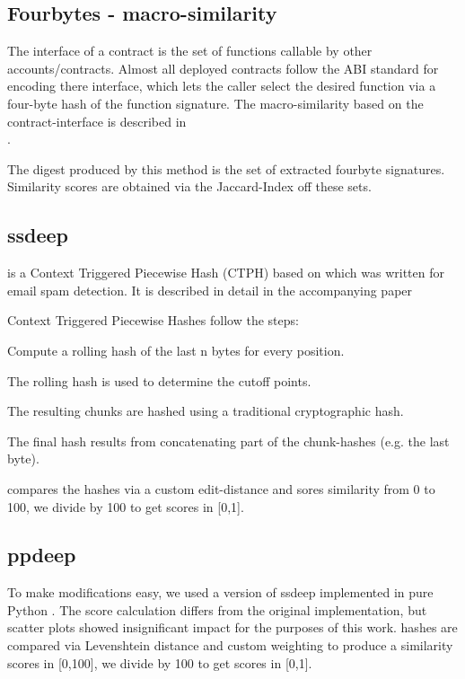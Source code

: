 \documentclass[../main.tex]{subfiles}
\begin{document}
\subsection{Fourbytes - macro-similarity \label{sec:fourbyte}}

The interface of a contract is the set of functions callable by other accounts/contracts.
Almost all deployed contracts follow the ABI standard for encoding there interface, which lets the caller select the desired function via a four-byte hash of the function signature.
The macro-similarity based on the contract-interface is described in \\.

The digest produced by this method is the set of extracted fourbyte signatures. Similarity scores are obtained via the Jaccard-Index  off these sets.

\subsection{ssdeep \label{sec:ssdeep}}
 is a Context Triggered Piecewise Hash (CTPH) based on  which was written for email spam detection. It is described in detail in the accompanying paper 

Context Triggered Piecewise Hashes follow the steps:
\begin{ol}
  \item Compute a rolling hash of the last n bytes for every position.
  \item The rolling hash is used to determine the cutoff points.
  \item The resulting chunks are hashed using a traditional cryptographic hash.
  \item The final hash results from concatenating part of the chunk-hashes (e.g. the last byte).
\end{ol}
 compares the hashes via a custom edit-distance and sores similarity from 0 to 100, we divide by 100 to get scores in [0,1].

\subsection{ppdeep \label{sec:ppdeep}}
To make modifications easy, we used a version of ssdeep implemented in pure Python . The score calculation differs from the original implementation, but scatter plots  showed insignificant impact for the purposes of this work.  hashes are compared via Levenshtein distance  and custom weighting to produce a similarity scores in [0,100], we divide by 100 to get scores in [0,1].
\end{document}
